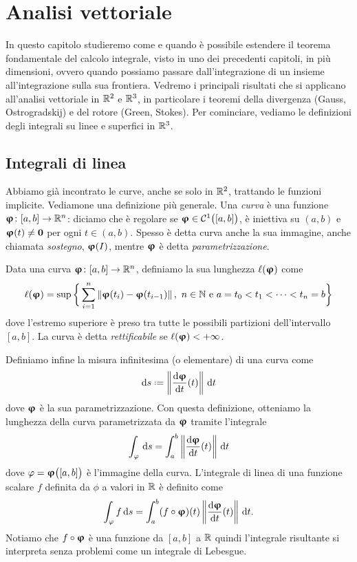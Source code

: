 \chapter{Analisi vettoriale}
In questo capitolo studieremo come e quando è possibile estendere il teorema fondamentale del calcolo integrale, visto in uno dei precedenti capitoli, in più dimensioni, ovvero quando possiamo passare dall'integrazione di un insieme all'integrazione sulla sua frontiera.
Vedremo i principali risultati che si applicano all'analisi vettoriale in $\mathbb{R}^2$ e $\mathbb{R}^3$, in particolare i teoremi della divergenza (Gauss, Ostrogradskij) e del rotore (Green, Stokes).
Per cominciare, vediamo le definizioni degli integrali su linee e superfici in $\mathbb{R}^3$.

\section{Integrali di linea}
Abbiamo già incontrato le curve, anche se solo in $\mathbb{R}^2$, trattando le funzioni implicite.
Vediamone una definizione più generale.
Una \emph{curva} è una funzione $\bm{\upvarphi}\colon [a,b]\to\mathbb{R}^n$: diciamo che è regolare se $\bm{\upvarphi}\in\mathcal{C}^{{1}}\big([a,b]\big)$, è iniettiva su $(a,b)$ e $\bm{\upvarphi}(t)\ne\mathbf{0}$ per ogni $t\in(a,b)$.
Spesso è detta curva anche la sua immagine, anche chiamata \emph{sostegno}, $\bm{\upvarphi}(I)$, mentre $\bm{\upvarphi}$ è detta \emph{parametrizzazione}.

\begin{definizione} \label{d:lunghezza-curva}
	Data una curva $\bm{\upvarphi}\colon[a,b]\to\mathbb{R}^n$, definiamo la sua lunghezza $\ell(\bm{\upvarphi})$ come
	\begin{equation}
		\ell(\vphi)=\sup\bigg\{\sum_{i=1}^n\norm{\vphi(t_i)-\vphi(t_{i-1})},\ n\in\N\text{ e }a=t_0<t_1<\cdots<t_n=b\bigg\}
		\label{eq:lunghezza-curva}
	\end{equation}
	dove l'estremo superiore è preso tra tutte le possibili partizioni dell'intervallo $[a,b]$.
	La curva è detta \emph{rettificabile} se $\ell(\bm{\upvarphi})<+\infty$.
\end{definizione}

Definiamo infine la misura infinitesima (o elementare) di una curva come
\begin{equation}
	\dd s\defeq\norm{\drv{\vphi}{t}(t)}\,\dd t
	\label{eq:misura-curva}
\end{equation}
dove $\bm{\upvarphi}$ è la sua parametrizzazione.
Con questa definizione, otteniamo la lunghezza della curva parametrizzata da $\bm{\upvarphi}$ tramite l'integrale
\begin{equation}
	\int_\varphi\,\textup{d} s=\int_a^b\left\|{\frac{\textup{d} {\bm{\upvarphi}}}{\textup{d} {t}}(t)}\right\|\,\textup{d} t
\end{equation}
dove $\varphi=\bm{\upvarphi}\big([a,b]\big)$ è l'immagine della curva.
L'integrale di linea di una funzione scalare $f$ definita da $\phi$ a valori in $\mathbb{R}$ è definito come
\begin{equation}
	\int_\varphi f\,\textup{d} s=\int_a^b(f\circ\bm{\upvarphi})(t)\left\|{\frac{\textup{d} {\bm{\upvarphi}}}{\textup{d} {t}}(t)}\right\|\,\textup{d} t.
\end{equation}
Notiamo che $f\circ\bm{\upvarphi}$ è una funzione da $[a,b]$ a $\mathbb{R}$ quindi l'integrale risultante si interpreta senza problemi come un integrale di Lebesgue.

